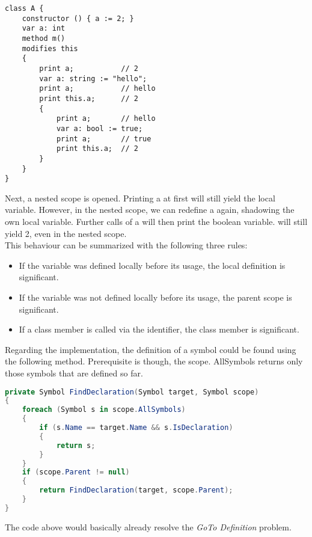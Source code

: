 \begin{lstlisting}[language = dafny, caption={Complex Shadowing Example}, captionpos=b, label={lst:shadowing}]
class A {
    constructor () { a := 2; }
    var a: int
    method m()
    modifies this
    {
        print a;           // 2
        var a: string := "hello";
        print a;           // hello
        print this.a;      // 2
        {
            print a;       // hello
            var a: bool := true;
            print a;       // true
            print this.a;  // 2
        }
    }
}
\end{lstlisting}

Next, a nested scope is opened. Printing a at first will still yield the local variable. However, in the nested scope, we can redefine a again, shadowing the own local variable. Further calls of a will then print the boolean variable.  will still yield 2, even in the nested scope.\\

This behaviour can be summarized with the following three rules:
\begin{itemize}
    \item If the variable was defined locally before its usage, the local definition is significant.
    \item If the variable was not defined locally before its usage, the parent scope is significant.
    \item If a class member is called via the  identifier, the class member is significant.
\end{itemize}

Regarding the implementation, the definition of a symbol could be found using the following method. Prerequisite is though, the scope. AllSymbols returns only those symbols that are defined so far.


\begin{lstlisting}[language=csharp, caption={Finding Symbol Definition}, captionpos=b, label={lst:findsymbol}]
private Symbol FindDeclaration(Symbol target, Symbol scope)
{
    foreach (Symbol s in scope.AllSymbols)
    {
        if (s.Name == target.Name && s.IsDeclaration)
        {
            return s;
        }
    }
    if (scope.Parent != null)
    {
        return FindDeclaration(target, scope.Parent);
    }
}
\end{lstlisting}

The code above would basically already resolve the \textit{GoTo Definition} problem.


